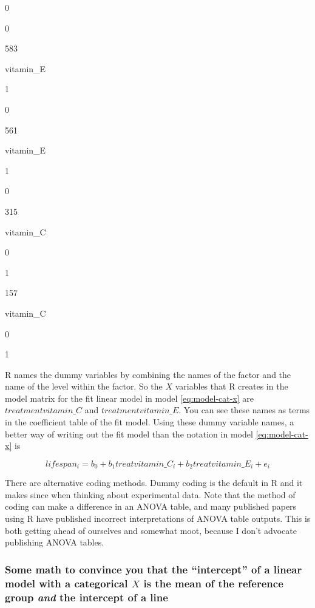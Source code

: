 \documentclass[]{book}
\begin{document}
0

0

583

vitamin\_E

1

0

561

vitamin\_E

1

0

315

vitamin\_C

0

1

157

vitamin\_C

0

1

R names the dummy variables by combining the names of the factor and the name of the level within the factor. So the \(X\) variables that R creates in the model matrix for the fit linear model in model \eqref{eq:model-cat-x} are \(treatmentvitamin\_C\) and \(treatmentvitamin\_E\). You can see these names as terms in the coefficient table of the fit model. Using these dummy variable names, a better way of writing out the fit model than the notation in model \eqref{eq:model-cat-x} is

\begin{equation}
lifespan_i = b_0 + b_1 treatvitamin\_C_i + b_2 treatvitamin\_E_i + e_i
\label{eq:model-cat-x-better}
\end{equation}

There are alternative coding methods. Dummy coding is the default in R and it makes since when thinking about experimental data. Note that the method of coding can make a difference in an ANOVA table, and many published papers using R have published incorrect interpretations of ANOVA table outputs. This is both getting ahead of ourselves and somewhat moot, because I don't advocate publishing ANOVA tables.

\hypertarget{some-math-to-convince-you-that-the-intercept-of-a-linear-model-with-a-categorical-x-is-the-mean-of-the-reference-group-and-the-intercept-of-a-line}{%
\subsubsection{\texorpdfstring{Some math to convince you that the ``intercept'' of a linear model with a categorical \(X\) is the mean of the reference group \emph{and} the intercept of a line}{Some math to convince you that the ``intercept'' of a linear model with a categorical X is the mean of the reference group and the intercept of a line}}\label{some-math-to-convince-you-that-the-intercept-of-a-linear-model-with-a-categorical-x-is-the-mean-of-the-reference-group-and-the-intercept-of-a-line}}
\end{document}
